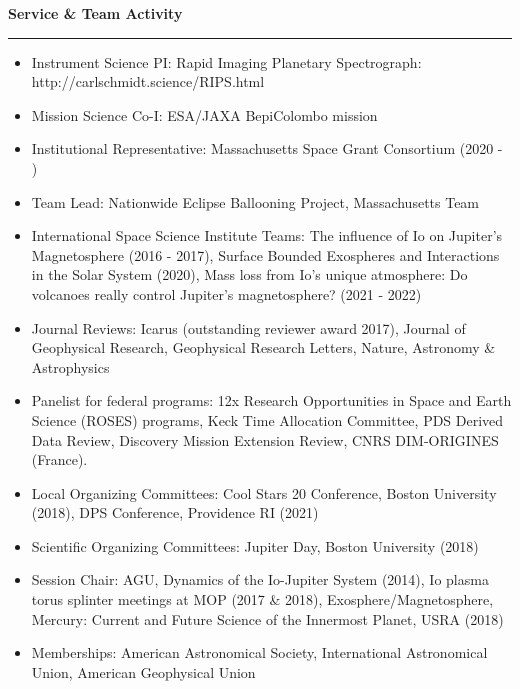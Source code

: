 \documentclass[12pt]{report}
\begin{document}
\noindent\bf{Service \& Team Activity}\rm \hspace*{\fill} \\
\rule{\textwidth}{1pt}
\begin{itemize} \itemsep -2pt %
  \item Instrument Science PI: Rapid Imaging Planetary Spectrograph: http://carlschmidt.science/RIPS.html
  \item Mission Science Co-I: ESA/JAXA BepiColombo mission
  \item Institutional Representative: Massachusetts Space Grant Consortium (2020 - )
  \item Team Lead: Nationwide Eclipse Ballooning Project, Massachusetts Team
  \item International Space Science Institute Teams: The influence of Io on Jupiter's Magnetosphere (2016 - 2017), Surface Bounded Exospheres and Interactions in the Solar System (2020), Mass loss from Io’s unique atmosphere: Do volcanoes really control Jupiter’s magnetosphere? (2021 - 2022)
  \item Journal Reviews: Icarus (outstanding reviewer award 2017), Journal of Geophysical Research, Geophysical Research Letters, Nature, Astronomy \& Astrophysics
  \item Panelist for federal programs: 12x Research Opportunities in Space and Earth Science (ROSES) programs, Keck Time Allocation Committee, PDS Derived Data Review, Discovery Mission Extension Review,  CNRS DIM-ORIGINES (France).
  \item Local Organizing Committees: Cool Stars 20 Conference, Boston University (2018), DPS Conference, Providence RI (2021)
  \item Scientific Organizing Committees: Jupiter Day, Boston University (2018)
  \item Session Chair: AGU, Dynamics of the Io-Jupiter System (2014), Io plasma torus splinter meetings at MOP (2017 \& 2018), Exosphere/Magnetosphere, Mercury: Current and Future Science of the Innermost Planet, USRA (2018)
  \item Memberships: American Astronomical Society, International Astronomical Union, American Geophysical Union
\end{itemize}
\vspace{2 mm}
\end{document}
